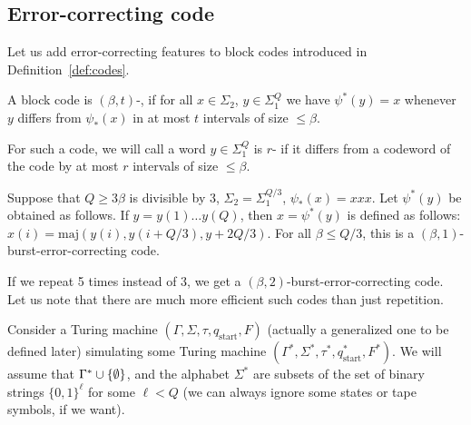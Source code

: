 \documentclass[12pt]{memoir}
\renewcommand{\le}{\leq}
\renewcommand{\ge}{\geq}
\newcommand{\fld}[1]{\ensuremath{\textit{#1\/}}}
\newcommand{\maj}{\mathrm{maj}}
\def\B{B}
\newcommand{\Tu}{T}
\newcommand{\Tus}{T^{*}}
\newcommand{\cDir}{\fld{cDir}}
\newcommand{\NonAdj}{\fld{NonAdj}}
\newcommand{\start}{\mathrm{start}}
\begin{document}
\subsection{Error-correcting code}\label{sec:coding}

Let us add error-correcting features to block codes introduced in
Definition~\ref{def:codes}.

\begin{sloppypar}
\begin{definition}\label{def:err-code}
A block code is \( (\beta,t) \)-,
if for all \( x\in\Sigma_{2} \), \( y\in\Sigma_{1}^{Q} \) we
have \( \psi^{*}(y)=x \) whenever \( y \) differs from
\( \psi_{*}(x) \) in at most \( t \) intervals of size \( \le\beta \).

For such a code, we will call a word \( y\in\Sigma_{1}^{Q} \) is \( r \)-
if it differs from a codeword of the code by at most \( r \) intervals of size \( \le\beta \).
\end{definition}
  \end{sloppypar}

\begin{example}\label{xmp:tripling}
  Suppose that \( Q\ge 3\beta \) is divisible by 3,
  \( \Sigma_{2}=\Sigma_{1}^{Q/3} \), \( \psi_{*}(x)=xxx \).
  Let \( \psi^{*}(y) \) be obtained as follows.
  If \( y=y(1)\dots y(Q) \), then \( x=\psi^{*}(y) \) is defined as follows:
    \( x(i)=\maj(y(i),y(i+Q/3),y+2Q/3) \).
    For all \( \beta\le Q/3 \), this is a
    \( (\beta,1) \)-burst-error-correcting code.

    If we repeat 5 times instead of 3, we get a \( (\beta,2) \)-burst-error-correcting
    code.
    Let us note that there are much more efficient such codes than just repetition.
 \end{example}

Consider a Turing machine 
\( (\Gamma, \Sigma,\tau, q_{\start},F) \) (actually a generalized one to be defined later)
simulating some Turing machine \( (\Gamma^{*}, \Sigma^{*},\tau^{*}, q^{*}_{\start},F^{*}) \).
We will assume that \( \Gamma^*\cup\mathopen\{\emptyset\mathclose\} \),
and the alphabet \( \Sigma^* \) are subsets of the set of  binary strings
\( \{0,1\}^{\ell} \) for some \( \ell<Q \) (we can always ignore some states or tape
symbols, if we want).
\end{document}
